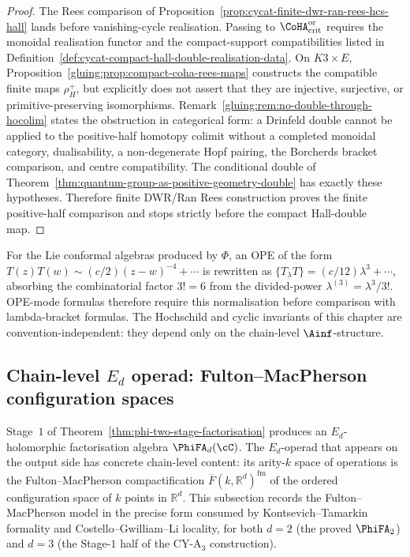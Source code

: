 \begin{proof}
The Rees comparison of
Proposition~\ref{prop:cycat-finite-dwr-ran-rees-hcs-hall} lands before
vanishing-cycle realisation. Passing to
\(\CoHA_{\mathrm{crit}}^{\mathrm{or}}\) requires the monoidal
realisation functor and the compact-support compatibilities listed in
Definition~\ref{def:cycat-compact-hall-double-realisation-data}. On
\(K3\times E\), Proposition~\ref{gluing:prop:compact-coha-rees-maps}
constructs the compatible finite maps \(\rho_H^+\), but explicitly does
not assert that they are injective, surjective, or primitive-preserving
isomorphisms. Remark~\ref{gluing:rem:no-double-through-hocolim} states
the obstruction in categorical form: a Drinfeld double cannot be
applied to the positive-half homotopy colimit without a completed
monoidal category, dualisability, a non-degenerate Hopf pairing, the
Borcherds bracket comparison, and centre compatibility. The conditional
double of Theorem~\ref{thm:quantum-group-as-positive-geometry-double}
has exactly these hypotheses. Therefore finite DWR/Ran Rees
construction proves the finite positive-half comparison and stops
strictly before the compact Hall-double map.
\end{proof}

\begin{remark}
\label{rem:cy-cat-cross-vol-conventions}
For the Lie conformal algebras produced by $\Phi$, an OPE of the form $T(z) T(w) \sim (c/2)(z - w)^{-4} + \cdots$ is rewritten as $\{T_\lambda T\} = (c/12) \lambda^3 + \cdots$, absorbing the combinatorial factor $3! = 6$ from the divided-power $\lambda^{(3)} = \lambda^3/3!$. OPE-mode formulas therefore require this normalisation before comparison with lambda-bracket formulas. The Hochschild and cyclic invariants of this chapter are convention-independent: they depend only on the chain-level $\Ainf$-structure.
\end{remark}

\subsection{Chain-level \texorpdfstring{$E_d$}{E-d} operad: Fulton--MacPherson configuration spaces}
\label{subsec:cy-cat-fm-config-spaces}

Stage~$1$ of Theorem~\ref{thm:phi-two-stage-factorisation} produces an
$E_d$-holomorphic factorisation algebra $\PhiFA_d(\cC)$. The $E_d$-operad
that appears on the output side has concrete chain-level content: its
arity-$k$ space of operations is the Fulton--MacPherson compactification
$\overline{F}(k, \mathbb{R}^d)^{\mathrm{fm}}$ of the ordered configuration space
of $k$ points in $\mathbb{R}^d$. This subsection records the
Fulton--MacPherson model in the precise form consumed by Kontsevich--Tamarkin
formality and Costello--Gwilliam--Li locality, for both $d = 2$ (the
proved $\PhiFA_2$) and $d = 3$ (the Stage-$1$ half of the CY-A$_3$
construction).

